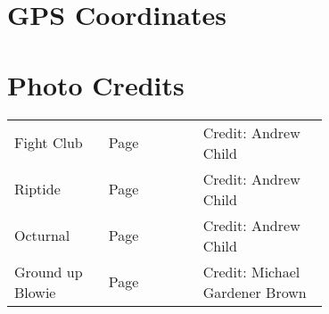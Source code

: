 \section{GPS Coordinates}
\section{Photo Credits}
\begin{supertabular}{p{0.3\linewidth}lp{0.4\linewidth}}
Fight Club&Page \pageref{pt:Fight Club}&Credit: Andrew Child\\
Riptide&Page \pageref{pt:Riptide}&Credit: Andrew Child\\
Octurnal&Page \pageref{pt:Octurnal}&Credit: Andrew Child\\
Ground up Blowie&Page \pageref{pt:Ground up Blowie}&Credit: Michael Gardener Brown\\
\end{supertabular}

\clearpage